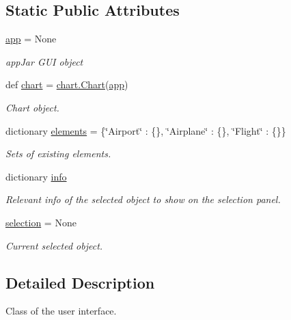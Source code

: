 \subsection*{Static Public Attributes}
\begin{DoxyCompactItemize}
\item 
\mbox{\label{classapp_1_1_app_a7e1b425e21cce7dcb596d72fad3c3282}} 
\hyperlink{classapp_1_1_app_a7e1b425e21cce7dcb596d72fad3c3282}{app} = None
\begin{DoxyCompactList}\small\item\em app\+Jar G\+UI object \end{DoxyCompactList}\item 
\mbox{\label{classapp_1_1_app_a9de028570fbb7ebc55c4e60f90bd1a38}} 
def \hyperlink{classapp_1_1_app_a9de028570fbb7ebc55c4e60f90bd1a38}{chart} = \hyperlink{classchart_1_1_chart}{chart.\+Chart}(\hyperlink{classapp_1_1_app_a7e1b425e21cce7dcb596d72fad3c3282}{app})
\begin{DoxyCompactList}\small\item\em Chart object. \end{DoxyCompactList}\item 
dictionary \hyperlink{classapp_1_1_app_a34fc4a7d78896ff3d20612ee6bb9e169}{elements} = \{\char`\"{}Airport\char`\"{} \+: \{\}, \char`\"{}Airplane\char`\"{} \+: \{\}, \char`\"{}Flight\char`\"{} \+: \{\}\}
\begin{DoxyCompactList}\small\item\em Sets of existing elements. \end{DoxyCompactList}\item 
dictionary \hyperlink{classapp_1_1_app_a5d704ba832744570b49e86417960c071}{info}
\begin{DoxyCompactList}\small\item\em Relevant info of the selected object to show on the selection panel. \end{DoxyCompactList}\item 
\hyperlink{classapp_1_1_app_a4cdfedd89ae2ab7854c7062dcb388acd}{selection} = None
\begin{DoxyCompactList}\small\item\em Current selected object. \end{DoxyCompactList}\end{DoxyCompactItemize}


\subsection{Detailed Description}
\begin{DoxyVerb}Class of the user interface.\end{DoxyVerb}
 

